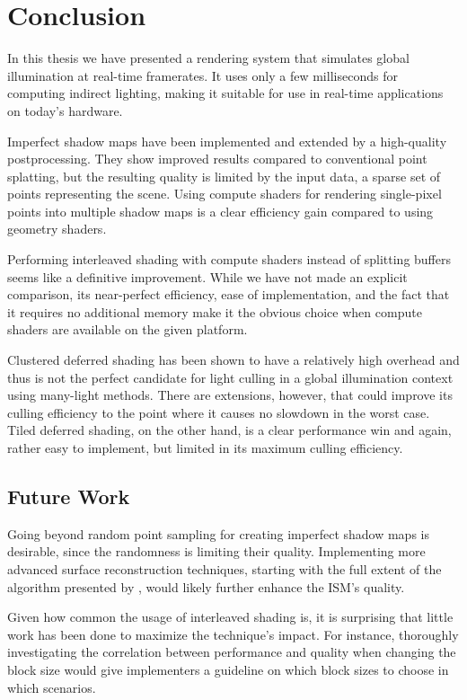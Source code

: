 

\chapter{Conclusion}
\label{chap:conclusion}

In this thesis we have presented a rendering system that simulates global illumination at real-time framerates. It uses only a few milliseconds for computing indirect lighting, making it suitable for use in real-time applications on today's hardware.

Imperfect shadow maps have been implemented and extended by a high-quality postprocessing. They show improved results compared to conventional point splatting, but the resulting quality is limited by the input data, a sparse set of points representing the scene. Using compute shaders for rendering single-pixel points into multiple shadow maps is a clear efficiency gain compared to using geometry shaders.

Performing interleaved shading with compute shaders instead of splitting buffers seems like a definitive improvement. While we have not made an explicit comparison, its near-perfect efficiency, ease of implementation, and the fact that it requires no additional memory make it the obvious choice when compute shaders are available on the given platform.

Clustered deferred shading has been shown to have a relatively high overhead and thus is not the perfect candidate for light culling in a global illumination context using many-light methods. There are extensions, however, that could improve its culling efficiency to the point where it causes no slowdown in the worst case. Tiled deferred shading, on the other hand, is a clear performance win and again, rather easy to implement, but limited in its maximum culling efficiency.

\section{Future Work}

Going beyond random point sampling for creating imperfect shadow maps is desirable, since the randomness is limiting their quality. Implementing more advanced surface reconstruction techniques, starting with the full extent of the algorithm presented by \citet{Marroquim:2007:reconstruction}, would likely further enhance the ISM's quality.

Given how common the usage of interleaved shading is, it is surprising that little work has been done to maximize the technique's impact. For instance, thoroughly investigating the correlation between performance and quality when changing the block size would give implementers a guideline on which block sizes to choose in which scenarios.

